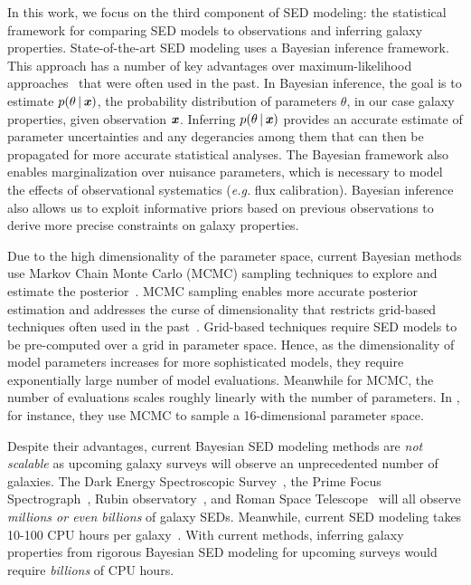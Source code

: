 In this work, we focus on the third component of SED modeling: the statistical
framework for comparing SED models to observations and inferring
galaxy properties. 
State-of-the-art SED modeling uses a Bayesian inference framework.
This approach has a number of key advantages over maximum-likelihood 
approaches~\citep[\emph{e.g.}][]{cidfernandes2005, tojeiro2007, koleva2008} 
that were often used in the past.
In Bayesian inference, the goal is to estimate $p(\theta\,|\,\textbf{\textit{x}})$, the
probability distribution of parameters $\theta$, in our case galaxy
properties, given observation $\textbf{\textit{x}}$. 
Inferring $p(\theta\,|\,\textbf{\textit{x}})$ provides an accurate estimate of parameter 
uncertainties and any degerancies among them that can then be propagated for
more accurate statistical analyses. 
The Bayesian framework also enables marginalization over nuisance parameters,
which is necessary to model the effects of observational systematics
(\emph{e.g.} flux calibration).
Bayesian inference also allows us to exploit informative priors based on
previous observations to derive more precise constraints on galaxy
properties. 

Due to the high dimensionality of the parameter space, current Bayesian methods
use Markov Chain Monte Carlo (MCMC) sampling techniques to explore and estimate
the posterior~\citep{acquaviva2011, chevallard2016, leja2017, carnall2018}. 
MCMC sampling enables more accurate posterior estimation and addresses the
curse of dimensionality that restricts grid-based techniques often used in the
past~\citep{kauffmann2003a, burgarella2005, salim2007, dacunha2008}.
Grid-based techniques require SED models to be pre-computed over a grid in
parameter space.
Hence, as the dimensionality of model parameters increases for more
sophisticated models, they require exponentially large number of model
evaluations.
Meanwhile for MCMC, the number of evaluations scales roughly linearly with the
number of parameters.  
In \cite{johnson2021}, for instance, they use MCMC to sample a 16-dimensional
parameter space. 

Despite their advantages, current Bayesian SED modeling methods are \emph{not
scalable} as upcoming galaxy surveys will observe an unprecedented number of
galaxies.
The Dark Energy Spectroscopic Survey~\citep[DESI;][]{desicollaboration2016},
the Prime Focus Spectrograph~\citep[PFS;][]{takada2014},
Rubin observatory~\citep{ivezic2019}, and Roman Space
Telescope~\citep{spergel2015} will all observe \emph{millions or even billions}
of galaxy SEDs. 
Meanwhile, current SED modeling takes 10-100 CPU hours per
galaxy~\citep[\emph{e.g.}][]{carnall2019a, tacchella2021}.
With current methods, inferring galaxy properties from rigorous Bayesian SED
modeling for upcoming surveys  would require \emph{billions} of CPU hours. 

